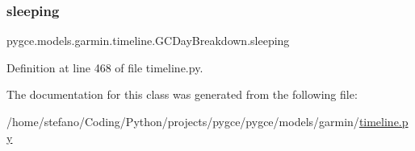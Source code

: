 \subsubsection{\texorpdfstring{sleeping}{sleeping}}
{\footnotesize\ttfamily pygce.\+models.\+garmin.\+timeline.\+G\+C\+Day\+Breakdown.\+sleeping}



Definition at line 468 of file timeline.\+py.



The documentation for this class was generated from the following file\+:\begin{DoxyCompactItemize}
\item 
/home/stefano/\+Coding/\+Python/projects/pygce/pygce/models/garmin/\hyperlink{timeline_8py}{timeline.\+py}\end{DoxyCompactItemize}
